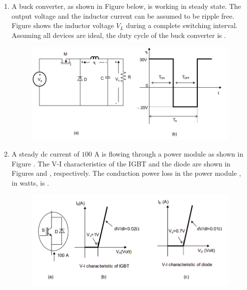 \documentclass[journal,12pt,onecolumn]{IEEEtran}
\theoremstyle{remark}
\begin{document}
\begin{enumerate}[start=1, label=Q.\arabic*]
    \hfill{}

    \item A buck converter, as shown in Figure  below, is working in steady state. The output voltage and the inductor current can be assumed to be ripple free. Figure  shows the inductor voltage $V_L$ during a complete switching interval. Assuming all devices are ideal, the duty cycle of the buck converter is \underline{\hspace{2cm}}.
    \begin{figure}[H]
        \includegraphics[width=0.9\columnwidth]{Figures/q22.png}
        \centering
        \caption{}
    \end{figure}

    \hfill{}

    \item A steady dc current of $100$ A is flowing through a power module  as shown in Figure . The V-I characteristics of the IGBT  and the diode  are shown in Figures  and , respectively. The conduction power loss in the power module , in watts, is \underline{\hspace{2cm}}.
    \begin{figure}[H]
        \includegraphics[width=0.9\columnwidth]{Figures/q23.png}
        \centering
        \caption{}
    \end{figure}


\end{enumerate}
\end{document}
